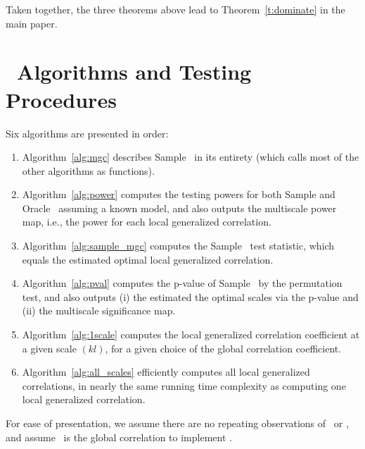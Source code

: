 \documentclass[11pt]{article}
\begin{document}
Taken together, the three theorems above lead to Theorem~\ref{t:dominate} in the main paper.


\clearpage

\section{\Mgc~Algorithms and Testing Procedures}
\label{appen:algorithms}


Six algorithms are presented in order:
\begin{enumerate}
\item Algorithm~\ref{alg:mgc} describes Sample \Mgc~in its entirety (which calls most of the other algorithms as functions). 
\item Algorithm~\ref{alg:power} computes the testing powers for both Sample and Oracle \Mgc~assuming a known model, and also outputs  the multiscale power map, i.e., the power for each local generalized correlation.
\item Algorithm~\ref{alg:sample_mgc} computes the Sample \Mgc~test statistic, which equals the estimated optimal local generalized correlation.
\item Algorithm~\ref{alg:pval} computes the p-value of Sample \Mgc~by the permutation test, and also outputs (i) the estimated the optimal scales via the p-value and (ii) the multiscale significance map. 
\item Algorithm~\ref{alg:1scale} computes the local generalized correlation coefficient at a given scale $(kl)$, for a given choice of the global correlation coefficient.
\item Algorithm~\ref{alg:all_scales} efficiently computes all local generalized correlations, in nearly the same running time complexity as computing one local generalized correlation. 
\end{enumerate}
For ease of presentation, we assume there are no repeating observations of \mbx~or \mby, and assume \Mcorr~is the global correlation to implement \Mgc.
\end{document}

